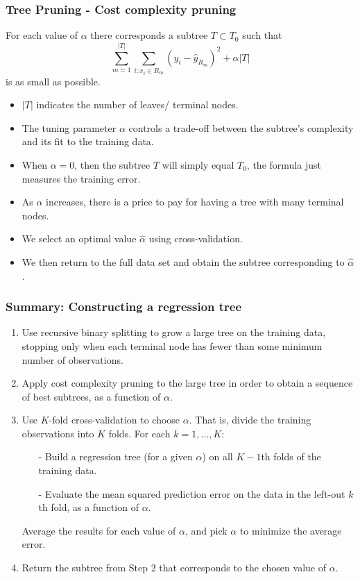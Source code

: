\documentclass{beamer}
\begin{document}
\begin{frame}\frametitle{Tree Pruning - Cost complexity pruning}
For each value of $\alpha$ there corresponds a subtree $T\subset T_0$ such that
$$\sum_{m=1}^{|T|}\sum_{i: x_i\in R_m}\left(y_i-\hat{y}_{R_m}\right)^2+\alpha |T|$$ is as small as possible.
\begin{itemize}
\item $|T|$ indicates the number of leaves/ terminal nodes.
\item The tuning parameter $\alpha$ controls a trade-off between the
subtree's complexity and its fit to the training data.
\item When $\alpha=0$, then the subtree $T$
will simply equal $T_0$, the formula just measures the training error.
\item As $\alpha$ increases, there is a price to pay for having a tree with
many terminal nodes.
\item We select an optimal value $\hat{\alpha}$ using cross-validation.
\item We then return to the full data set and obtain the subtree
corresponding to $\hat{\alpha}$.
\end{itemize}
\end{frame}

\begin{frame}\frametitle{Summary: Constructing a regression tree}
\begin{enumerate}
\item Use recursive binary splitting to grow a large tree on the training
data, stopping only when each terminal node has fewer than some
minimum number of observations.
\vspace*{0.2cm}
\item Apply cost complexity pruning to the large tree in order to obtain a
sequence of best subtrees, as a function of $\alpha$.
\vspace*{0.2cm}
\item Use $K$-fold cross-validation to choose $\alpha$. That is, divide the training
observations into $K$ folds. For each $k=1,...,K$:
\begin{itemize}
  \item[-] Build a regression tree (for a given $\alpha$) on all $K-1$th folds of the training data.
  \item[-] Evaluate the mean squared prediction error on the data in the
left-out $k$th fold, as a function of $\alpha$.
\end{itemize}
\vspace*{0.2cm}
Average the results for each value of $\alpha$, and pick $\alpha$ to minimize the
average error.
\vspace*{0.2cm}
\item Return the subtree from Step 2 that corresponds to the chosen value
of $\alpha$.
\end{enumerate}
\end{frame}
\end{document}
